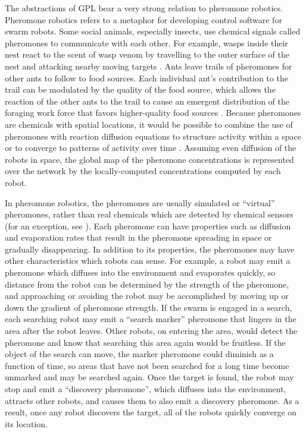 \documentclass[]{article}
\begin{document}
The abstractions of GPL bear a very strong relation to pheromone robotics. 
Pheromone robotics refers to a metaphor for developing control software for swarm robots. 
Some social animals, especially insects, use chemical signals called pheromones to communicate with each other. 
For example, wasps inside their nest react to the scent of wasp venom by travelling to the outer surface of the nest and attacking nearby moving targets  \cite{jeanne1981alarm}.
Ants leave trails of pheromones for other ants to follow to food sources. 
Each individual ant's contribution to the trail can be modulated by the quality of the food source, which allows the reaction of the other ants to the trail to cause an emergent distribution of the foraging work force that favors higher-quality food sources \cite{sumpter2003nonlinearity}.
Because pheromones are chemicals with spatial locations, it would be possible to combine the use of pheromones with reaction diffusion equations to structure activity within a space or to converge to patterns of activity over time  \cite{turing1952chemical}. 
Assuming even diffusion of the robots in space, the global map of the pheromone concentrations is represented over the network by the locally-computed concentrations computed by each robot.

In pheromone robotics, the pheromones are usually simulated or ``virtual'' pheromones, rather than real chemicals which are detected by chemical sensors (for an exception, see \cite{hayes2001swarm}). 
Each pheromone can have properties such as diffusion and evaporation rates that result in the pheromone spreading in space or gradually disappearing. 
In addition to its properties, the pheromones may have other characteristics which robots can sense. 
For example, a robot may emit a pheromone which diffuses into the environment and evaporates quickly, so distance from the robot can be determined by the strength of the pheromone, and approaching or avoiding the robot may be accomplished by moving up or down the gradient of pheromone strength. 
If the swarm is engaged in a search, each searching robot may emit a ``search marker'' pheromone that lingers in the area after the robot leaves. 
Other robots, on entering the area, would detect the pheromone and know that searching this area again would be fruitless. 
If the object of the search can move, the marker pheromone could diminish as a function of time, so areas that have not been searched for a long time become unmarked and may be searched again. 
Once the target is found, the robot may stop and emit a ``discovery pheromone'', which diffuses into the environment, attracts other robots, and causes them to also emit a discovery pheromone. 
As a result, once any robot discovers the target, all of the robots quickly converge on its location. 
\end{document}
